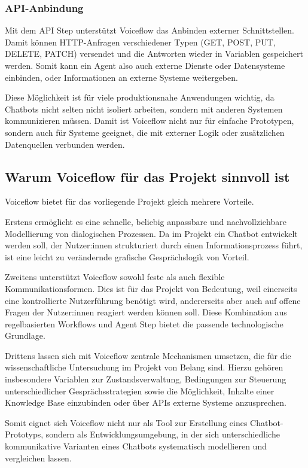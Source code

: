 \subsubsection{API-Anbindung}

Mit dem API Step unterstützt Voiceflow das Anbinden externer Schnittstellen. 
Damit können HTTP-Anfragen verschiedener Typen (GET, POST, PUT, DELETE, PATCH) 
versendet und die Antworten wieder in Variablen gespeichert werden. Somit kann 
ein Agent also auch externe Dienste oder Datensysteme einbinden, oder 
Informationen an externe Systeme weitergeben.

Diese Möglichkeit ist für viele produktionsnahe Anwendungen wichtig, da Chatbots 
nicht selten nicht isoliert arbeiten, sondern mit anderen Systemen kommunizieren 
müssen. Damit ist Voiceflow nicht nur für einfache Prototypen, sondern auch für 
Systeme geeignet, die mit externer Logik oder zusätzlichen Datenquellen verbunden 
werden.

\subsection{Warum Voiceflow für das Projekt sinnvoll ist}

Voiceflow bietet für das vorliegende Projekt gleich mehrere Vorteile.

Erstens ermöglicht es eine schnelle, beliebig anpassbare und nachvollziehbare 
Modellierung von dialogischen Prozessen. Da im Projekt ein Chatbot entwickelt 
werden soll, der Nutzer:innen strukturiert durch einen Informationsprozess führt, 
ist eine leicht zu verändernde grafische Gesprächslogik von Vorteil.

Zweitens unterstützt Voiceflow sowohl feste als auch flexible Kommunikationsformen.
Dies ist für das Projekt von Bedeutung, weil einerseits eine kontrollierte 
Nutzerführung benötigt wird, andererseits aber auch auf offene Fragen der 
Nutzer:innen reagiert werden können soll. Diese Kombination aus regelbasierten 
Workflows und Agent Step bietet die passende technologische Grundlage.

Drittens lassen sich mit Voiceflow zentrale Mechanismen umsetzen, die für die 
wissenschaftliche Untersuchung im Projekt von Belang sind. Hierzu gehören 
insbesondere Variablen zur Zustandsverwaltung, Bedingungen zur Steuerung 
unterschiedlicher Gesprächsstrategien sowie die Möglichkeit, Inhalte einer 
Knowledge Base einzubinden oder über APIs externe Systeme anzusprechen.

Somit eignet sich Voiceflow nicht nur als Tool zur Erstellung eines 
Chatbot-Prototyps, sondern als Entwicklungsumgebung, in der sich unterschiedliche 
kommunikative Varianten eines Chatbots systematisch modellieren und vergleichen 
lassen.

